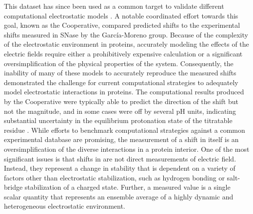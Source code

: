 This dataset has since been used as a common target to validate different computational electrostatic models \cite{Liu2018, Nielsen2011}. 
A notable coordinated effort towards this goal, known as the \pKa{} Cooperative, compared predicted \pKa{} shifts to the experimental \pKa{} shifts measured in SNase by the Garc\'ia-Moreno group. 
Because of the complexity of the electrostatic environment in proteins, accurately modeling the effects of the electric fields require either a prohibitively expensive calculation or a significant oversimplification of the physical properties of the system. 
Consequently, the inability of many of these models to accurately reproduce the measured \pKa{} shifts demonstrated the challenge for current computational strategies to adequately model electrostatic interactions in proteins. 
The computational results produced by the \pKa{} Cooperative were typically able to predict the direction of the \pKa{} shift but not the magnitude, and in some cases were off by several pH units, indicating substantial uncertainty in the equilibrium protonation state of the titratable residue \cite{Alexov2011, Arthur2011}. 
While efforts to benchmark computational strategies against a common experimental database are promising, the measurement of a \pKa{} shift in itself is an oversimplification of the diverse interactions in a protein interior. 
One of the most significant issues is that shifts in \pKa{} are not direct measurements of electric field. 
Instead, they represent a change in stability that is dependent on a variety of factors other than electrostatic stabilization, such as hydrogen bonding or salt-bridge stabilization of a charged state. 
Further, a measured \pKa{} value is a single scalar quantity that represents an ensemble average of a highly dynamic and heterogeneous electrostatic environment. 

